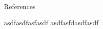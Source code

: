 
\begin{block}{References}
\vskip1cm
\small{\begin{thebibliography}{99}
 asdfasdfasfasdf
 asdfasfdasdfasdf
\end{thebibliography}}
\vspace{0.75in}
\end{block}